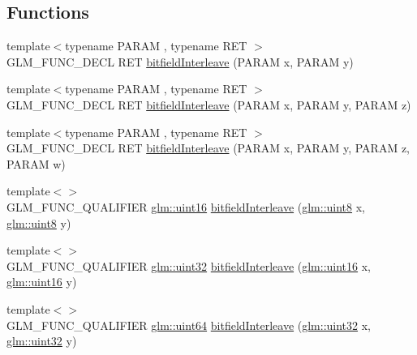 \subsection*{Functions}
\begin{DoxyCompactItemize}
\item 
{\footnotesize template$<$typename P\+A\+R\+A\+M , typename R\+E\+T $>$ }\\G\+L\+M\+\_\+\+F\+U\+N\+C\+\_\+\+D\+E\+C\+L R\+E\+T \hyperlink{namespaceglm_1_1detail_a39644ee418ae41e3393d1cb6191e32a7}{bitfield\+Interleave} (P\+A\+R\+A\+M x, P\+A\+R\+A\+M y)
\item 
{\footnotesize template$<$typename P\+A\+R\+A\+M , typename R\+E\+T $>$ }\\G\+L\+M\+\_\+\+F\+U\+N\+C\+\_\+\+D\+E\+C\+L R\+E\+T \hyperlink{namespaceglm_1_1detail_aa2fdd8f720417a13990873ba704a3426}{bitfield\+Interleave} (P\+A\+R\+A\+M x, P\+A\+R\+A\+M y, P\+A\+R\+A\+M z)
\item 
{\footnotesize template$<$typename P\+A\+R\+A\+M , typename R\+E\+T $>$ }\\G\+L\+M\+\_\+\+F\+U\+N\+C\+\_\+\+D\+E\+C\+L R\+E\+T \hyperlink{namespaceglm_1_1detail_a606f6dc8c8314159fafef68f820c2c65}{bitfield\+Interleave} (P\+A\+R\+A\+M x, P\+A\+R\+A\+M y, P\+A\+R\+A\+M z, P\+A\+R\+A\+M w)
\item 
{\footnotesize template$<$$>$ }\\G\+L\+M\+\_\+\+F\+U\+N\+C\+\_\+\+Q\+U\+A\+L\+I\+F\+I\+E\+R \hyperlink{group__gtc__type__precision_gad8c2939e1fdd8e5828b31d95c52255d5}{glm\+::uint16} \hyperlink{namespaceglm_1_1detail_ac59c574dc7900d87786f5a96f82ea6e7}{bitfield\+Interleave} (\hyperlink{group__gtc__type__precision_ga1a7dcd8aac97cc8020817c94049deff2}{glm\+::uint8} x, \hyperlink{group__gtc__type__precision_ga1a7dcd8aac97cc8020817c94049deff2}{glm\+::uint8} y)
\item 
{\footnotesize template$<$$>$ }\\G\+L\+M\+\_\+\+F\+U\+N\+C\+\_\+\+Q\+U\+A\+L\+I\+F\+I\+E\+R \hyperlink{group__gtc__type__precision_ga202b6a53c105fcb7e531f9b443518451}{glm\+::uint32} \hyperlink{namespaceglm_1_1detail_ac5f2b38221d4447775e88f1b003f8113}{bitfield\+Interleave} (\hyperlink{group__gtc__type__precision_gad8c2939e1fdd8e5828b31d95c52255d5}{glm\+::uint16} x, \hyperlink{group__gtc__type__precision_gad8c2939e1fdd8e5828b31d95c52255d5}{glm\+::uint16} y)
\item 
{\footnotesize template$<$$>$ }\\G\+L\+M\+\_\+\+F\+U\+N\+C\+\_\+\+Q\+U\+A\+L\+I\+F\+I\+E\+R \hyperlink{group__gtc__type__precision_gae3632bf9b37da66233d78930dd06378a}{glm\+::uint64} \hyperlink{namespaceglm_1_1detail_a7f40bc91b3d293fae0f7df8de85cdcc6}{bitfield\+Interleave} (\hyperlink{group__gtc__type__precision_ga202b6a53c105fcb7e531f9b443518451}{glm\+::uint32} x, \hyperlink{group__gtc__type__precision_ga202b6a53c105fcb7e531f9b443518451}{glm\+::uint32} y)

\end{DoxyCompactItemize}
